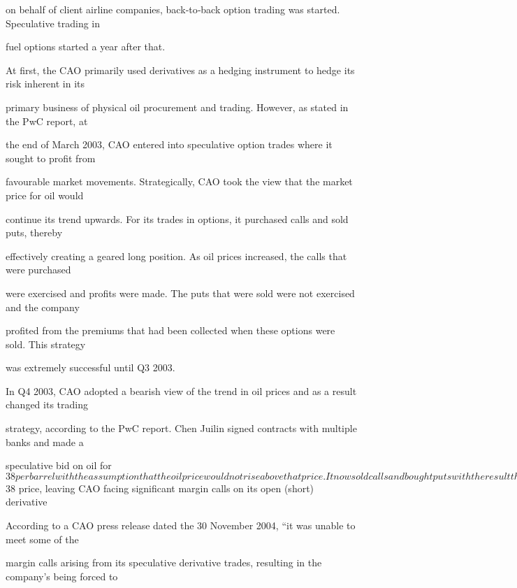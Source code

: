 on behalf of client airline companies, back‐to‐back option trading was started. Speculative trading in

fuel options started a year after that.

At first, the CAO primarily used derivatives as a hedging instrument to hedge its risk inherent in its

primary business of physical oil procurement and trading. However, as stated in the PwC report, at

the end of March 2003, CAO entered into speculative option trades where it sought to profit from

favourable market movements. Strategically, CAO took the view that the market price for oil would

continue its trend upwards. For its trades in options, it purchased calls and sold puts, thereby

effectively creating a geared long position. As oil prices increased, the calls that were purchased

were exercised and profits were made. The puts that were sold were not exercised and the company

profited from the premiums that had been collected when these options were sold. This strategy

was extremely successful until Q3 2003.

In Q4 2003, CAO adopted a bearish view of the trend in oil prices and as a result changed its trading

strategy, according to the PwC report. Chen Juilin signed contracts with multiple banks and made a

speculative bid on oil for $38 per barrel with the assumption that the oil price would not rise above

that price. It now sold calls and bought puts with the result that it was in a short position at the end

However, the company’s strategy started to unravel when oil prices did not decrease from the end

of 2003. In October 2004, the situation came to a head when international oil prices grossly

surpassed the $38 price, leaving CAO facing significant margin calls on its open (short) derivative

According to a CAO press release dated the 30 November 2004, “it was unable to meet some of the

margin calls arising from its speculative derivative trades, resulting in the company’s being forced to


